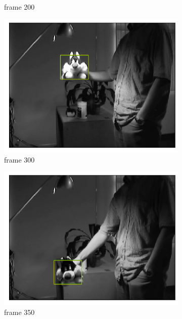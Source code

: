 \documentclass[11pt]{article}
\begin{document}
\begin{figure}[h!]
\begin{subfigure}{.195\textwidth}
      \caption{frame 200}
    \end{subfigure}
    \begin{subfigure}{.195\textwidth}
      \centering
      \includegraphics[width=.95\linewidth]{../results/sylvseqrects_299.png}
      \caption{frame 300}
    \end{subfigure}
    \begin{subfigure}{.195\textwidth}
      \centering
      \includegraphics[width=.95\linewidth]{../results/sylvseqrects_349.png}
      \caption{frame 350}
    \end{subfigure}
    \begin{subfigure}{.195\textwidth}
      \centering

\end{subfigure}
\end{figure}
\end{document}

